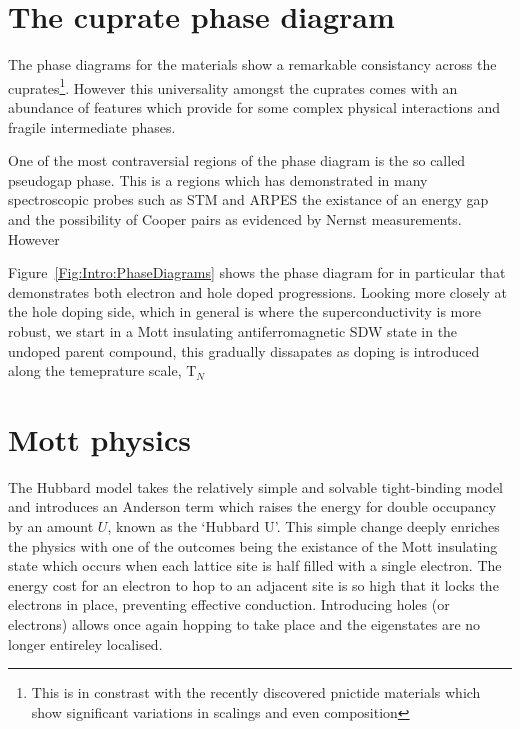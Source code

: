 
\section{The cuprate phase diagram}

The phase diagrams for the \highTc materials show a remarkable consistancy across the cuprates\footnote{This is in constrast with the recently discovered pnictide materials which show significant variations in scalings and even composition}. However this universality amongst the cuprates comes with an abundance of features which provide for some complex physical interactions and fragile intermediate phases. 

One of the most contraversial regions of the phase diagram is the so called pseudogap phase. This is a regions which has demonstrated in many spectroscopic probes such as \ac{STM} and \ac{ARPES} the existance of an energy gap and the possibility of Cooper pairs as evidenced by Nernst measurements. However 

Figure~\ref{Fig:Intro:PhaseDiagrams} shows the phase diagram for  in particular that demonstrates both electron and hole doped progressions. Looking more closely at the hole doping side, which in general is where the superconductivity is more robust, we start in a Mott insulating antiferromagnetic \ac{SDW} state in the undoped parent compound, this gradually dissapates as doping is introduced along the temeprature scale, T$_N$



\section{Mott physics}

The Hubbard model takes the relatively simple and solvable tight-binding model and introduces an Anderson term which raises the energy for double occupancy by an amount $U$, known as the `Hubbard U'. This simple change deeply enriches the physics with one of the outcomes being the existance of the Mott insulating state which occurs when each lattice site is half filled with a single electron. The energy cost for an electron to hop to an adjacent site is so high that it locks the electrons in place, preventing effective conduction. Introducing holes (or electrons) allows once again hopping to take place and the eigenstates are no longer entireley localised.
